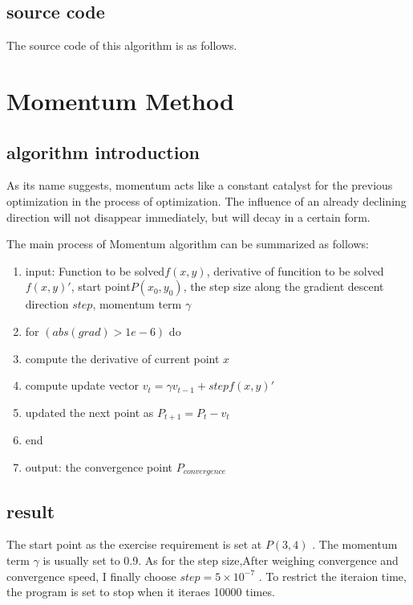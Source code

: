 \documentclass[aps,letterpaper,10pt]{article}
\begin{document}
\subsection{source code}
The source code of this algorithm is as follows.  \vspace{5mm}
	
	\vspace{3mm}



\newpage
\section{Momentum Method}
\subsection{algorithm introduction}
As its name suggests, momentum acts like a constant catalyst for the previous optimization in the process of optimization. The influence of an already declining direction will not disappear immediately, but will decay in a certain form.\vspace{3mm}

The main process of Momentum algorithm can be summarized as follows:

\begin{enumerate}
	\item input: Function to be solved$f(x,y)$, derivative of funcition to be solved${f(x,y)}'$, start point$P(x_0,y_0)$, the step size along the gradient descent direction $step$, momentum term $\gamma$
	\item for $(abs(grad)> 1e-6)$ do
	\item compute the derivative of current point $x$
  \item compute update vector $v_t=\gamma v_{t-1} + step{f(x,y)}'$
	\item updated the next point as $P_{t+1}=P_t - v_t$
  \item end
	\item output: the convergence point $P_{convergence}$
\end{enumerate}


\subsection{result}
The start point as the exercise requirement is set at $P(3,4)$ . The momentum term $\gamma$ is usually set to 0.9. As for the step size,After weighing convergence and convergence speed, I finally choose $step = 5\times10^{-7}$ . To restrict the iteraion time, the program is set to stop when it iteraes 10000 times.
\end{document}
